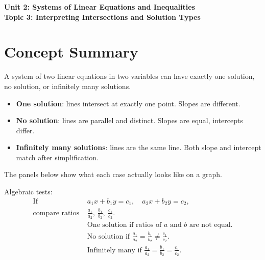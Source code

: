 \documentclass[14pt]{extarticle}
\begin{document}
\raggedright
{}

\begin{center}
    \LARGE \textbf{Unit 2: Systems of Linear Equations and Inequalities} \\[6pt]
    \Large \textbf{Topic 3: Interpreting Intersections and Solution Types}
\end{center}

\vspace{1em}

\section*{Concept Summary}

A system of two linear equations in two variables can have exactly one solution, no solution, or infinitely many solutions.

\begin{itemize}
    \item \textbf{One solution}: lines intersect at exactly one point. Slopes are different.
    \item \textbf{No solution}: lines are parallel and distinct. Slopes are equal, intercepts differ.
    \item \textbf{Infinitely many solutions}: lines are the same line. Both slope and intercept match after simplification.
\end{itemize}

The panels below show what each case actually looks like on a graph.


Algebraic tests:
\[
\begin{aligned}
\text{If } &a_1x + b_1y = c_1,\quad a_2x + b_2y = c_2,\\
\text{compare ratios } &\frac{a_1}{a_2},\ \frac{b_1}{b_2},\ \frac{c_1}{c_2}.\\
&\text{One solution if ratios of }a\text{ and }b\text{ are not equal.}\\
&\text{No solution if } \frac{a_1}{a_2}=\frac{b_1}{b_2}\neq \frac{c_1}{c_2}.\\
&\text{Infinitely many if } \frac{a_1}{a_2}=\frac{b_1}{b_2}=\frac{c_1}{c_2}.
\end{aligned}
\]
\end{document}
